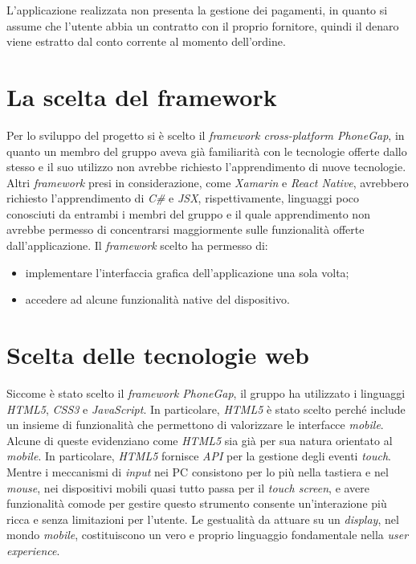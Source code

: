 \documentclass[12pt, a4paper, titlepage]{report}
\begin{document}
	\noindent L'applicazione realizzata non presenta la gestione dei pagamenti, in quanto si assume che l'utente abbia un contratto con il proprio fornitore, quindi il denaro viene estratto dal conto corrente al momento dell'ordine.
	
	\section{La scelta del framework}
	
	Per lo sviluppo del progetto si è scelto il \textit{framework cross-platform PhoneGap}, in quanto un membro del gruppo aveva già familiarità con le tecnologie offerte dallo stesso e il suo utilizzo non avrebbe richiesto l'apprendimento di nuove tecnologie. Altri \textit{framework} presi in considerazione, come \textit{Xamarin} e \textit{React Native}, avrebbero richiesto l'apprendimento di \textit{C\#} e \textit{JSX}, rispettivamente, linguaggi poco conosciuti da entrambi i membri del gruppo e il quale apprendimento non avrebbe permesso di concentrarsi maggiormente sulle funzionalità offerte dall'applicazione. Il \textit{framework} scelto ha permesso di:
	\begin{itemize}
		\item implementare l'interfaccia grafica dell'applicazione una sola volta;
		\item accedere ad alcune funzionalità native del dispositivo.
	\end{itemize}
	
	\section{Scelta delle tecnologie web}
	
	Siccome è stato scelto il \textit{framework PhoneGap}, il gruppo ha utilizzato i linguaggi \textit{HTML5}, \textit{CSS3} e \textit{JavaScript}. In particolare, \textit{HTML5} è stato scelto perché include un insieme di funzionalità che permettono di valorizzare le interfacce \textit{mobile}. Alcune di queste evidenziano come \textit{HTML5} sia già per sua natura orientato al \textit{mobile}. In particolare, \textit{HTML5} fornisce \textit{API} per la gestione degli eventi \textit{touch}. Mentre i meccanismi di \textit{input} nei PC consistono per lo più nella tastiera e nel \textit{mouse}, nei dispositivi mobili quasi tutto passa per il \textit{touch screen}, e avere funzionalità comode per gestire questo strumento consente un'interazione più ricca e senza limitazioni per l'utente. Le gestualità da attuare su un \textit{display}, nel mondo \textit{mobile}, costituiscono un vero e proprio linguaggio fondamentale nella \textit{user experience}.
	\medskip
	
\end{document}
